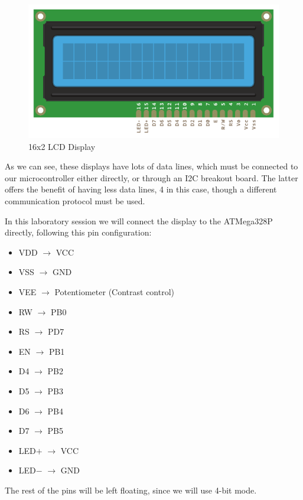 \begin{figure}[H]
    \centering
    \includegraphics[scale = 0.9]{Graphics/MICROS/Practice 2/LCD.pdf}
    \caption{16x2 LCD Display~\autocite{ARDUINO}}
    \label{fig:LCD_DISPLAY}
\end{figure}

As we can see, these displays have lots of data lines, which must be connected to our microcontroller either directly, or through an I2C breakout board. The latter offers the benefit of having less data lines, 4 in this case, though a different communication protocol must be used. \medskip

In this laboratory session we will connect the display to the ATMega328P directly, following this pin configuration:

\begin{itemize}
    \item VDD  $\rightarrow$ VCC
    \item VSS  $\rightarrow$ GND
    \item VEE  $\rightarrow$ Potentiometer (Contrast control)
    \item RW   $\rightarrow$ PB0
    \item RS   $\rightarrow$ PD7
    \item EN   $\rightarrow$ PB1
    \item D4   $\rightarrow$ PB2
    \item D5   $\rightarrow$ PB3
    \item D6   $\rightarrow$ PB4
    \item D7   $\rightarrow$ PB5
    \item LED$+$ $\rightarrow$ VCC
    \item LED$-$ $\rightarrow$ GND
\end{itemize}

The rest of the pins will be left floating, since we will use 4-bit mode.\medskip


